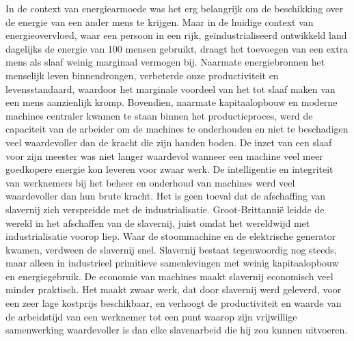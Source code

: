 In de context van energiearmoede was het erg belangrijk om de beschikking over de energie van een ander mens te krijgen. Maar in de huidige context van energieovervloed, waar een persoon in een rijk, geïndustrialiseerd ontwikkeld land dagelijks de energie van 100 mensen gebruikt, draagt het toevoegen van een extra mens als slaaf weinig marginaal vermogen bij. Naarmate energiebronnen het menselijk leven binnendrongen, verbeterde onze productiviteit en levensstandaard, waardoor het marginale voordeel van het tot slaaf maken van een mens aanzienlijk kromp. Bovendien, naarmate kapitaalopbouw en moderne machines centraler kwamen te staan binnen het productieproces, werd de capaciteit van de arbeider om de machines te onderhouden en niet te beschadigen veel waardevoller dan de kracht die zijn handen boden. De inzet van een slaaf voor zijn meester was niet langer waardevol wanneer een machine veel meer goedkopere energie kon leveren voor zwaar werk. De intelligentie en integriteit van werknemers bij het beheer en onderhoud van machines werd veel waardevoller dan hun brute kracht. Het is geen toeval dat de afschaffing van slavernij zich verspreidde met de industrialisatie. Groot-Brittannië leidde de wereld in het afschaffen van de slavernij, juist omdat het wereldwijd met industrialisatie voorop liep. Waar de stoommachine en de elektrische generator kwamen, verdween de slavernij snel. Slavernij bestaat tegenwoordig nog steeds, maar alleen in industrieel primitieve samenlevingen met weinig kapitaalopbouw en energiegebruik. De economie van machines maakt slavernij economisch veel minder praktisch. Het maakt zwaar werk, dat door slavernij werd geleverd, voor een zeer lage kostprijs beschikbaar, en verhoogt de productiviteit en waarde van de arbeidstijd van een werknemer tot een punt waarop zijn vrijwillige samenwerking waardevoller is dan elke slavenarbeid die hij zou kunnen uitvoeren.

